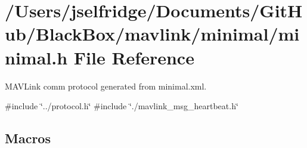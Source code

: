 \section{/\+Users/jselfridge/\+Documents/\+Git\+Hub/\+Black\+Box/mavlink/minimal/minimal.h File Reference}
\label{minimal_8h}


M\+A\+V\+Link comm protocol generated from minimal.\+xml.  


{\ttfamily \#include \char`\"{}../protocol.\+h\char`\"{}}\newline
{\ttfamily \#include \char`\"{}./mavlink\+\_\+msg\+\_\+heartbeat.\+h\char`\"{}}\newline
\subsection*{Macros}

